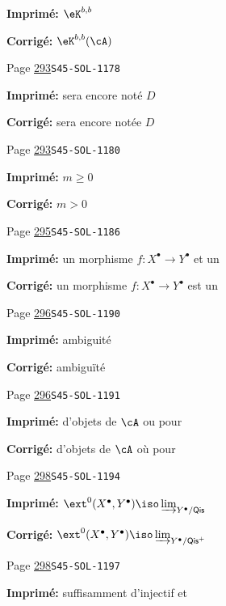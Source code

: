 \begin{description}
\par\noindent\textbf{Imprimé:} \(\eK^{b,b}\)
\par\noindent\textbf{Corrigé:} \(\eK^{b,b}(\cA)\)
\smallskip
\item[\hypertarget{apparatus:FR-0295}{295}] Page \hyperlink{printpage:fr:293}{293}\quad\texttt{S45-SOL-1178}
\par\noindent\textbf{Imprimé:} sera encore noté $D$
\par\noindent\textbf{Corrigé:} sera encore notée $D$
\smallskip
\item[\hypertarget{apparatus:FR-0296}{296}] Page \hyperlink{printpage:fr:293}{293}\quad\texttt{S45-SOL-1180}
\par\noindent\textbf{Imprimé:} $m\geqslant 0$
\par\noindent\textbf{Corrigé:} $m>0$
\smallskip
\item[\hypertarget{apparatus:FR-0297}{297}] Page \hyperlink{printpage:fr:295}{295}\quad\texttt{S45-SOL-1186}
\par\noindent\textbf{Imprimé:} un morphisme $f:X^\bullet \to Y^\bullet$ et un
\par\noindent\textbf{Corrigé:} un morphisme $f:X^\bullet \to Y^\bullet$ est un
\smallskip
\item[\hypertarget{apparatus:FR-0298}{298}] Page \hyperlink{printpage:fr:296}{296}\quad\texttt{S45-SOL-1190}
\par\noindent\textbf{Imprimé:} ambiguité
\par\noindent\textbf{Corrigé:} ambiguïté
\smallskip
\item[\hypertarget{apparatus:FR-0299}{299}] Page \hyperlink{printpage:fr:296}{296}\quad\texttt{S45-SOL-1191}
\par\noindent\textbf{Imprimé:} d'objets de $\cA$ ou pour
\par\noindent\textbf{Corrigé:} d'objets de $\cA$ où pour
\smallskip
\item[\hypertarget{apparatus:FR-0300}{300}] Page \hyperlink{printpage:fr:298}{298}\quad\texttt{S45-SOL-1194}
\par\noindent\textbf{Imprimé:} \(\ext^0(X^\bullet,Y^\bullet) \iso \varinjlim_{Y^\bullet/\mathsf{Qis}}\)
\par\noindent\textbf{Corrigé:} \(\ext^0(X^\bullet,Y^\bullet) \iso \varinjlim_{Y^\bullet/\mathsf{Qis}^+}\)
\smallskip
\item[\hypertarget{apparatus:FR-0301}{301}] Page \hyperlink{printpage:fr:298}{298}\quad\texttt{S45-SOL-1197}
\par\noindent\textbf{Imprimé:} suffisamment d'injectif et

\end{description}

